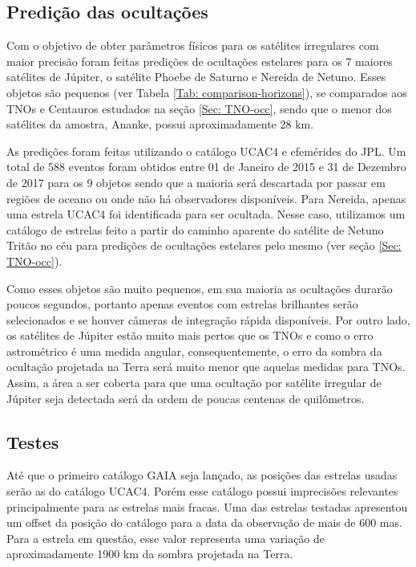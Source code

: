 \documentclass[12pt,a4paper]{monografia}
\begin{document}
\subsection{Prediç\~ao das ocultaç\~oes}
\label{Subsec: Irr-predic}

\indent \indent Com o objetivo de obter parâmetros físicos para os satélites irregulares com maior precisão foram feitas predições de ocultações estelares para os 7 maiores satélites de Júpiter, o satélite Phoebe de Saturno e Nereida de Netuno. Esses objetos são pequenos (ver Tabela \ref{Tab: comparison-horizons}), se comparados aos TNOs e Centauros estudados na seção \ref{Sec: TNO-occ}, sendo que o menor dos satélites da amostra, Ananke, possui aproximadamente 28 km.

As predições foram feitas utilizando o catálogo UCAC4 e efemérides do JPL. Um total de 588 eventos foram obtidos entre 01 de Janeiro de 2015 e 31 de Dezembro de 2017 para os 9 objetos sendo que a maioria será descartada por passar em regiões de oceano ou onde não há observadores disponíveis. Para Nereida, apenas uma estrela UCAC4 foi identificada para ser ocultada. Nesse caso, utilizamos um catálogo de estrelas feito a partir do caminho aparente do satélite de Netuno Tritão no céu para predições de ocultações estelares pelo mesmo (ver seção \ref{Sec: TNO-occ}).

Como esses objetos são muito pequenos, em sua maioria as ocultações durarão poucos segundos, portanto apenas eventos com estrelas brilhantes serão selecionados e se houver câmeras de integração rápida disponíveis. Por outro lado, os satélites de Júpiter estão muito mais pertos que os TNOs e como o erro astrométrico é uma medida angular, consequentemente, o erro da sombra da ocultação projetada na Terra será muito menor que aquelas medidas para TNOs. Assim, a área a ser coberta para que uma ocultação por satélite irregular de Júpiter seja detectada será da ordem de poucas centenas de quilômetros.

\subsection{Testes}
\label{Subsec: Irr-testes}

\indent \indent Até que o primeiro catálogo GAIA seja lançado, as posições das estrelas usadas serão as do catálogo UCAC4. Porém esse catálogo possui imprecisões relevantes principalmente para as estrelas mais fracas. Uma das estrelas testadas apresentou um offset da posição do catálogo para a data da observação de mais de 600 mas. Para a estrela em questão, esse valor representa uma variação de aproximadamente 1900 km da sombra projetada na Terra.
\end{document}
